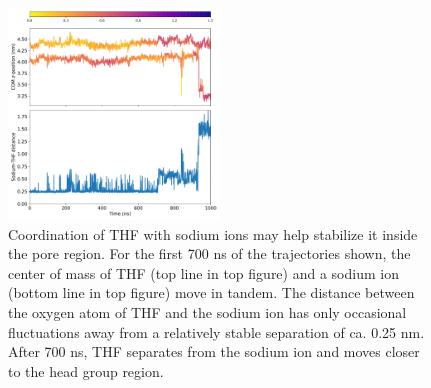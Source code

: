 \documentclass{article}
\begin{document}
  \begin{figure}
  \centering
  \includegraphics[width=0.5\textwidth]{thf_sodium_coordination.pdf}
  \caption{Coordination of THF with sodium ions may help stabilize it inside the
  pore region. For the first 700 ns of the trajectories shown, the center of mass
  of THF (top line in top figure) and a sodium ion (bottom line in top figure) move
  in tandem. The distance between the oxygen atom of THF and the sodium ion has only
  occasional fluctuations away from a relatively stable separation of ca. 0.25 nm. 
  After 700 ns, THF separates from the sodium ion and moves closer to the head group
  region.}\label{fig:thf_sodium_coordination}
  \end{figure}
  
%  
  
\end{document}
